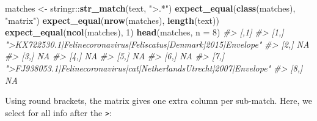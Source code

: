 \documentclass[]{book}
\newenvironment{Shaded}{}{}
\newcommand{\CommentTok}[1]{\textcolor[rgb]{0.38,0.63,0.69}{\textit{#1}}}
\newcommand{\DataTypeTok}[1]{\textcolor[rgb]{0.56,0.13,0.00}{#1}}
\newcommand{\DecValTok}[1]{\textcolor[rgb]{0.25,0.63,0.44}{#1}}
\newcommand{\KeywordTok}[1]{\textcolor[rgb]{0.00,0.44,0.13}{\textbf{#1}}}
\newcommand{\NormalTok}[1]{#1}
\newcommand{\OperatorTok}[1]{\textcolor[rgb]{0.40,0.40,0.40}{#1}}
\newcommand{\StringTok}[1]{\textcolor[rgb]{0.25,0.44,0.63}{#1}}
\begin{document}
\begin{Shaded}
\begin{Highlighting}[]
\NormalTok{matches <-}\StringTok{ }\NormalTok{stringr}\OperatorTok{::}\KeywordTok{str_match}\NormalTok{(text, }\StringTok{">.*"}\NormalTok{)}
\KeywordTok{expect_equal}\NormalTok{(}\KeywordTok{class}\NormalTok{(matches), }\StringTok{"matrix"}\NormalTok{)}
\KeywordTok{expect_equal}\NormalTok{(}\KeywordTok{nrow}\NormalTok{(matches), }\KeywordTok{length}\NormalTok{(text))}
\KeywordTok{expect_equal}\NormalTok{(}\KeywordTok{ncol}\NormalTok{(matches), }\DecValTok{1}\NormalTok{)}
\KeywordTok{head}\NormalTok{(matches, }\DataTypeTok{n =} \DecValTok{8}\NormalTok{)}
\CommentTok{#>      [,1]                                                                }
\CommentTok{#> [1,] ">KX722530.1|Felinecoronavirus|Feliscatus|Denmark|2015|Envelope"    }
\CommentTok{#> [2,] NA                                                                  }
\CommentTok{#> [3,] NA                                                                  }
\CommentTok{#> [4,] NA                                                                  }
\CommentTok{#> [5,] NA                                                                  }
\CommentTok{#> [6,] NA                                                                  }
\CommentTok{#> [7,] ">FJ938053.1|Felinecoronavirus|cat|NetherlandsUtrecht|2007|Envelope"}
\CommentTok{#> [8,] NA}
\end{Highlighting}
\end{Shaded}

Using round brackets, the matrix gives one extra column per sub-match.
Here, we select for all info after the \texttt{\textgreater{}}:
\end{document}
